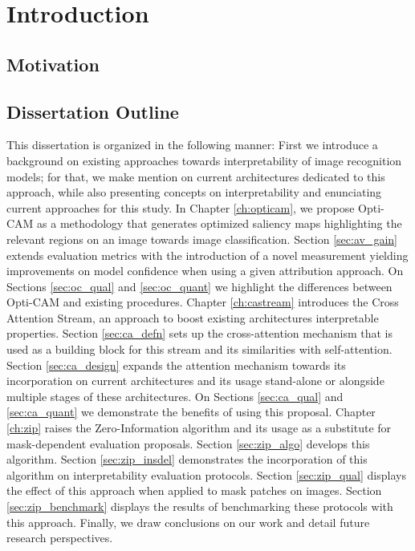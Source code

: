     \chapter*{Introduction}
    \chaptertoc{}

    \section*{Motivation}

    \section*{Dissertation Outline}
    This dissertation is organized in the following manner: First
    we introduce a background on existing approaches towards interpretability of image
    recognition models; for that, we make mention on current architectures dedicated 
    to this approach, while also presenting concepts on interpretability and enunciating 
    current approaches for this study. 
    In Chapter \ref{ch:opticam}, we propose Opti-CAM as a methodology that generates 
    optimized saliency maps highlighting the relevant regions on an image towards image
    classification. Section \ref{sec:av_gain} extends evaluation metrics with the 
    introduction of a novel measurement yielding improvements on model confidence 
    when using a given attribution approach. 
    On Sections \ref{sec:oc_qual} and \ref{sec:oc_quant} we highlight the differences 
    between Opti-CAM and existing procedures. Chapter \ref{ch:castream} introduces 
    the Cross Attention Stream, an approach to boost existing architectures
    interpretable properties. Section \ref{sec:ca_defn} sets up the cross-attention 
    mechanism that is used as a building block for this stream and its similarities with
    self-attention.  Section \ref{sec:ca_design} expands the attention mechanism 
    towards its incorporation on current architectures and its usage stand-alone or alongside
    multiple stages of these architectures. On Sections \ref{sec:ca_qual} and \ref{sec:ca_quant}
    we demonstrate the benefits of using this proposal.
    Chapter \ref{ch:zip} raises the Zero-Information algorithm and its usage as a substitute
    for mask-dependent evaluation proposals. Section \ref{sec:zip_algo} develops this 
    algorithm. Section \ref{sec:zip_insdel} demonstrates the incorporation of this 
    algorithm on interpretability evaluation protocols. Section \ref{sec:zip_qual} displays
    the effect of this approach when applied to mask patches on images. Section \ref{sec:zip_benchmark} 
    displays the results of benchmarking these protocols with this approach. Finally, 
    we draw conclusions on our work and detail future research perspectives.

